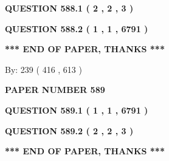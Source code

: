 \documentclass[12pt]{article}
\begin{document}
\vspace{0.2in}
  
{\textbf{\Large{QUESTION
588.1 
 ( 2 , 2 , 3 )
}}}
  
  
  
\vspace{0.2in}
  
{\textbf{\Large{QUESTION
588.2 
 ( 1 , 1 , 6791 )
}}}
  
  
   
   
 \vspace{0.2in}
 
   
   
   
   
\vspace{1.0in} 
{\textbf{\large{ *** END OF PAPER, THANKS *** }}} 
   
   
\hspace{1.0in} By: 
 239 ( 416 ,  613 )
   
   
   
   
\newpage 
\setcounter{page}{ 
   589001 } 
   
   
   
   
 {\textbf{ \Large{ PAPER NUMBER  589  }}}
   
   
\vspace{0.2in}
   
   
   
   
   
   
 \vspace{0.2in}
 
 
 
 
   
   
  
\vspace{0.2in}
  
{\textbf{\Large{QUESTION
589.1 
 ( 1 , 1 , 6791 )
}}}
  
  
  
\vspace{0.2in}
  
{\textbf{\Large{QUESTION
589.2 
 ( 2 , 2 , 3 )
}}}
  
  
   
   
 \vspace{0.2in}
 
   
   
   
   
\vspace{1.0in} 
{\textbf{\large{ *** END OF PAPER, THANKS *** }}} 
   
\end{document}
